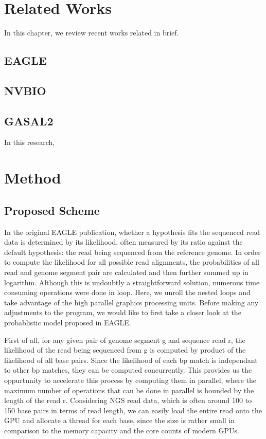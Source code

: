 \documentclass{PHlab-thesis}
\begin{document}
\chapter{Related Works}
In this chapter, we review recent works related in brief.
\section{EAGLE}
\section{NVBIO}
\section{GASAL2}
In this research, 

\chapter{Method}
\section{Proposed Scheme}
In the original EAGLE publication, whether a hypothesis fits the sequenced read data is determined by its likelihood, often measured by its ratio against the default hypothesis: the read being sequenced from the reference genome. In order to compute the likelihood for all possible read alignments, the probabilities of all read and genome segment pair are calculated and then further summed up in logarithm. Although this is undoubtly a straightforward solution, numerous time consuming operations were done in loop. Here, we unroll the nested loops and take advantage of the high parallel graphics processing units. 
Before making any adjustments to the program, we would like to first take a closer look at the probablistic model proposed in EAGLE.


First of all, for any given pair of genome segment g and sequence read r, the likelihood of the read being sequenced from g is computed by product of the likelihood of all base pairs. Since the likelihood of each bp match is independant to other bp matches, they can be computed concurrently. This provides us the oppurtunity to accelerate this process by computing them in parallel, where the maximum number of operations that can be done in parallel is bounded by the length of the read r. Considering NGS read data, which is often around 100 to 150 base pairs in terms of read length, we can easily load the entire read onto the GPU and allocate a thread for each base, since the size is rather small in comparison to the memory capacity and the core counts of modern GPUs.
\end{document}
